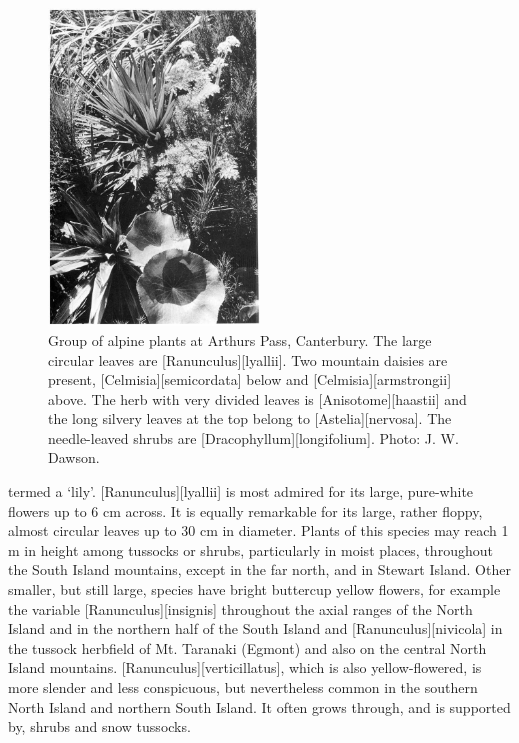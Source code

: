 \begin{figure}
	\includegraphics[width=0.5\textwidth]{graphics/figure100alpine-plants.jpg}
	\centering
	\caption[Alpine plants at Arthurs Pass]{Group of alpine plants at Arthurs Pass, Canterbury.
	The large circular leaves are [Ranunculus][lyallii].
	Two mountain daisies are present, [Celmisia][semicordata]  below and [Celmisia][armstrongii] above.
	The herb with very divided leaves is [Anisotome][haastii] and the long silvery leaves at the top belong to [Astelia][nervosa].
	The needle-leaved shrubs are [Dracophyllum][longifolium].
	Photo: J. W. Dawson.}%
	\label{fig:100alpine-plants}
\end{figure}

termed a `lily'. [Ranunculus][lyallii] is most admired for its large, pure-white flowers up to 6 cm across.
It is equally remarkable for its large, rather floppy, almost circular leaves up to 30 cm in diameter.
Plants of this species may reach 1 m in height among tussocks or shrubs, particularly in moist places, throughout the South Island mountains, except in the far north, and in Stewart Island.
Other smaller, but still large, species have bright buttercup yellow flowers, for example the variable [Ranunculus][insignis] throughout the axial ranges of the North Island and in the northern half of the South Island and [Ranunculus][nivicola] in the tussock herbfield of Mt.
Taranaki (Egmont) and also on the central North Island mountains. [Ranunculus][verticillatus], which is also yellow-flowered, is more slender and less conspicuous, but nevertheless common in the southern North Island and northern South Island.
It often grows through, and is supported by, shrubs and snow tussocks.

